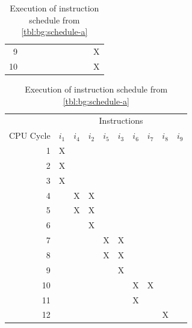 \begin{table}
\begin{subtable}{0.48\textwidth}
\begin{tabular}{rccccccccc}
             9 &   &   &   &   &   &   &   &   & X \\ \rowcolor[gray]{.975}
            10 &   &   &   &   &   &   &   &   & X \\
            \bottomrule
        \end{tabular}
        \caption{Execution of instruction schedule from \cref{tbl:bg:schedule-a}}
        \label{tbl:bg:schedule-comparison-a}
    \end{subtable}
    \hfill
    \begin{subtable}{0.48\textwidth}
        \begin{tabular}{rccccccccc} \toprule
            & \multicolumn{9}{c}{\fontsize{11pt}{9pt}\selectfont Instructions} \\
            \cmidrule{2-10}
            {\fontsize{11pt}{9pt}\selectfont CPU Cycle} & 
            {\fontsize{11pt}{9pt}\selectfont $i_1$} & 
            {\fontsize{11pt}{9pt}\selectfont $i_4$} & 
            {\fontsize{11pt}{9pt}\selectfont $i_2$} & 
            {\fontsize{11pt}{9pt}\selectfont $i_5$} & 
            {\fontsize{11pt}{9pt}\selectfont $i_3$} & 
            {\fontsize{11pt}{9pt}\selectfont $i_6$} & 
            {\fontsize{11pt}{9pt}\selectfont $i_7$} & 
            {\fontsize{11pt}{9pt}\selectfont $i_8$} & 
            {\fontsize{11pt}{9pt}\selectfont $i_9$} \\
            \midrule
             1 & X &   &   &   &   &   &   &   &   \\ \rowcolor[gray]{.975}
             2 & X &   &   &   &   &   &   &   &   \\
             3 & X &   &   &   &   &   &   &   &   \\ \rowcolor[gray]{.975}
             4 &   & X & X &   &   &   &   &   &   \\
             5 &   & X & X &   &   &   &   &   &   \\ \rowcolor[gray]{.975}
             6 &   &   & X &   &   &   &   &   &   \\
             7 &   &   &   & X & X &   &   &   &   \\ \rowcolor[gray]{.975}
             8 &   &   &   & X & X &   &   &   &   \\
             9 &   &   &   &   & X &   &   &   &   \\ \rowcolor[gray]{.975}
            10 &   &   &   &   &   & X & X &   &   \\
            11 &   &   &   &   &   & X &   &   &   \\ \rowcolor[gray]{.975}
            12 &   &   &   &   &   &   &   & X &   \\

\end{tabular}
\end{subtable}
\end{table}
